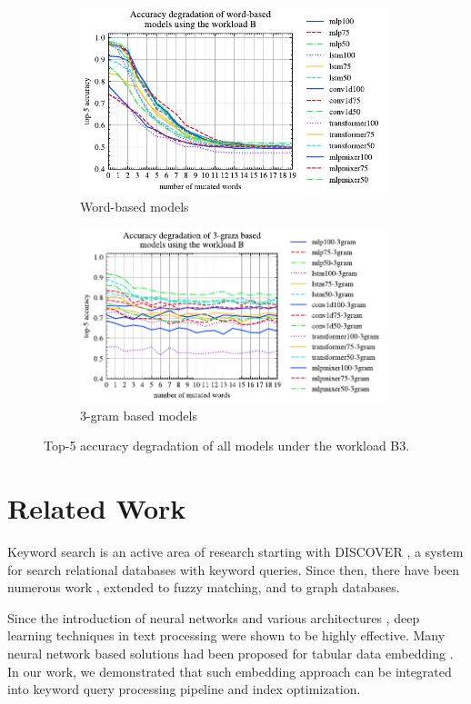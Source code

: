 \documentclass[conference]{IEEEtran}
\begin{document}
\begin{figure}[!th]
	\centering
	\begin{subfigure}[]{0.45\textwidth}
		\includegraphics[width=3.5in]{graphics/acc_degradation_word_based_B.pdf}
		\caption{Word-based models}
		\label{fig:acc_degradation_workload_B_word_based}
	\end{subfigure}
	\begin{subfigure}[]{0.45\textwidth}
		\includegraphics[width=3.5in]{graphics/acc_degradation_3gram_based_B.pdf}
		\caption{3-gram based models}
		\label{fig:acc_degradation_workload_B_3gram}
	\end{subfigure}
	\caption{Top-5 accuracy degradation of all models under the workload B3.}
	\label{fig:acc_degradation_workload_B_all}
\end{figure}

\section{Related Work}

Keyword search is an active area of research starting with DISCOVER \cite{hristidis2002discover}, a system for search relational databases with keyword queries.  Since then, there have been numerous work \cite{yu2022keyword}, extended to fuzzy matching, and to graph databases.

Since the introduction of neural networks and various architectures \cite{lecun2015deep,DBLP:journals/corr/VaswaniSPUJGKP17,DBLP:journals/corr/abs-2105-01601}, deep learning techniques in text processing \cite{kudo2018sentencepiece,gorishniy2021revisiting,tripathy2021comprehensive} were shown to be highly effective.  Many neural network based solutions had been proposed for tabular data embedding \cite{du2021tabularnet,zhang2019table2vec,huang2020tabtransformer,gorishniy2022embeddings,luo2020network,yin-etal-2020-tabert,tabbie2021}.  In our work, we demonstrated that such embedding approach can be integrated into keyword query processing pipeline and index optimization.
\end{document}
